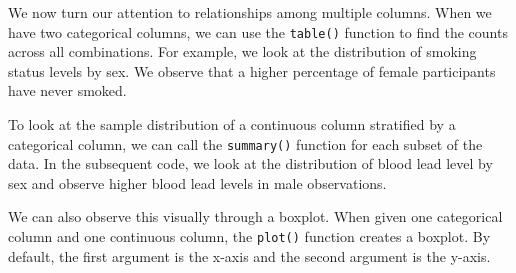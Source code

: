 \documentclass[
  letterpaper,
]{latex/krantz}
\makeatletter
\newenvironment{Shaded}{\begin{snugshade}}{\end{snugshade}}
\newcommand{\CommentTok}[1]{\textcolor[rgb]{0.37,0.37,0.37}{#1}}
\newcommand{\FunctionTok}[1]{\textcolor[rgb]{0.28,0.35,0.67}{#1}}
\newcommand{\NormalTok}[1]{\textcolor[rgb]{0.00,0.23,0.31}{#1}}
\newcommand{\SpecialCharTok}[1]{\textcolor[rgb]{0.37,0.37,0.37}{#1}}
\newcommand{\StringTok}[1]{\textcolor[rgb]{0.13,0.47,0.30}{#1}}
\newenvironment{kframe}{%
\medskip{}
\setlength{\fboxsep}{.8em}
 \def\at@end@of@kframe{}%
 \ifinner\ifhmode%
  \def\at@end@of@kframe{\end{minipage}}%
  \begin{minipage}{\columnwidth}%
 \fi\fi%
 \def\FrameCommand##1{\hskip\@totalleftmargin \hskip-\fboxsep
 \colorbox{shadecolor}{##1}\hskip-\fboxsep
     \hskip-\linewidth \hskip-\@totalleftmargin \hskip\columnwidth}%
 \MakeFramed {\advance\hsize-\width
   \@totalleftmargin\z@ \linewidth\hsize
   \@setminipage}}%
 {\par\unskip\endMakeFramed%
 \at@end@of@kframe}
\renewenvironment{Shaded}{\begin{kframe}}{\end{kframe}}
\makeatother
\begin{document}
We now turn our attention to relationships among multiple columns. When
we have two categorical columns, we can use the \texttt{table()}
function to find the counts across all combinations. For example, we
look at the distribution of smoking status levels by sex. We observe
that a higher percentage of female participants have never smoked.

\begin{Shaded}
\end{Shaded}

To look at the sample distribution of a continuous column stratified by
a categorical column, we can call the \texttt{summary()} function for
each subset of the data. In the subsequent code, we look at the
distribution of blood lead level by sex and observe higher blood lead
levels in male observations.

\begin{Shaded}
\end{Shaded}

We can also observe this visually through a
boxplot. When given one categorical column and one
continuous column, the
\texttt{plot()} function
creates a boxplot. By default, the first argument is the x-axis and the
second argument is the y-axis.
\end{document}
